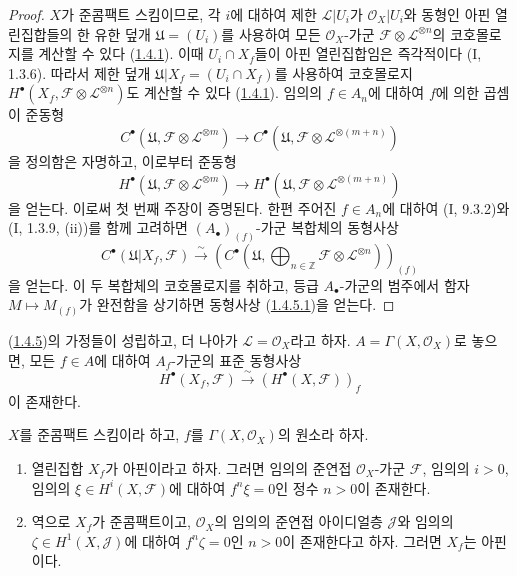 \begin{proof}
$X$가 준콤팩트 스킴이므로, 각 $i$에 대하여 제한
$\mathcal L\vert U_i$가 $\mathcal O_X\vert U_i$와 동형인 아핀
열린집합들의 한 유한 덮개 $\mathfrak U=(U_i)$를 사용하여 모든
$\mathcal O_X$-가군 $\mathcal F\otimes\mathcal L^{\otimes n}$의
코호몰로지를 계산할 수 있다 (\hyperref[III.1.4.1-fr]{1.4.1}). 이때
$U_i\cap X_f$들이 아핀 열린집합임은 즉각적이다 (I, 1.3.6). 따라서 제한
덮개 $\mathfrak U\vert X_f=(U_i\cap X_f)$를 사용하여 코호몰로지
$H^\bullet(X_f,\mathcal F\otimes\mathcal L^{\otimes n})$도 계산할 수 있다
(\hyperref[III.1.4.1-fr]{1.4.1}). 임의의 $f\in A_n$에 대하여 $f$에
의한 곱셈이 준동형
\[
C^\bullet(\mathfrak U,\mathcal F\otimes\mathcal L^{\otimes m})
\longrightarrow
C^\bullet(\mathfrak U,\mathcal F\otimes\mathcal L^{\otimes(m+n)})
\]
을 정의함은 자명하고, 이로부터 준동형
\[
H^\bullet(\mathfrak U,\mathcal F\otimes\mathcal L^{\otimes m})
\longrightarrow
H^\bullet(\mathfrak U,\mathcal F\otimes\mathcal L^{\otimes(m+n)})
\]
을 얻는다. 이로써 첫 번째 주장이 증명된다. 한편 주어진
$f\in A_n$에 대하여 (I, 9.3.2)와 (I, 1.3.9, (ii))를 함께 고려하면
$(A_\bullet)_{(f)}$-가군 복합체의 동형사상
\[
C^\bullet(\mathfrak U\vert X_f,\mathcal F)
\xrightarrow{\sim}
\left(C^\bullet\left(\mathfrak U,
\bigoplus_{n\in\mathbb Z}\mathcal F\otimes\mathcal L^{\otimes n}
\right)\right)_{(f)}
\]
을 얻는다. 이 두 복합체의 코호몰로지를 취하고, 등급
$A_\bullet$-가군의 범주에서 함자 $M\mapsto M_{(f)}$가 완전함을
상기하면 동형사상 (\hyperref[III.1.4.5.1-fr]{1.4.5.1})을 얻는다.
\end{proof}

\begin{corollary}[1.4.6]
\label{III.1.4.6-fr}
(\hyperref[III.1.4.5-fr]{1.4.5})의 가정들이 성립하고, 더 나아가
$\mathcal L=\mathcal O_X$라고 하자. $A=\Gamma(X,\mathcal O_X)$로 놓으면,
모든 $f\in A$에 대하여 $A_f$-가군의 표준 동형사상
\[
H^\bullet(X_f,\mathcal F)
\xrightarrow{\sim}(H^\bullet(X,\mathcal F))_f
\]
이 존재한다.
\end{corollary}

\begin{corollary}[1.4.7]
\label{III.1.4.7-fr}
$X$를 준콤팩트 스킴이라 하고, $f$를 $\Gamma(X,\mathcal O_X)$의 원소라
하자.
\begin{enumerate}
\item[(i)] 열린집합 $X_f$가 아핀이라고 하자. 그러면 임의의 준연접
$\mathcal O_X$-가군 $\mathcal F$, 임의의 $i>0$, 임의의
$\xi\in H^i(X,\mathcal F)$에 대하여 $f^n\xi=0$인 정수 $n>0$이 존재한다.
\item[(ii)] 역으로 $X_f$가 준콤팩트이고, $\mathcal O_X$의 임의의 준연접
아이디얼층 $\mathcal J$와 임의의 $\zeta\in H^1(X,\mathcal J)$에 대하여
$f^n\zeta=0$인 $n>0$이 존재한다고 하자. 그러면 $X_f$는 아핀이다.
\end{enumerate}
\end{corollary}

